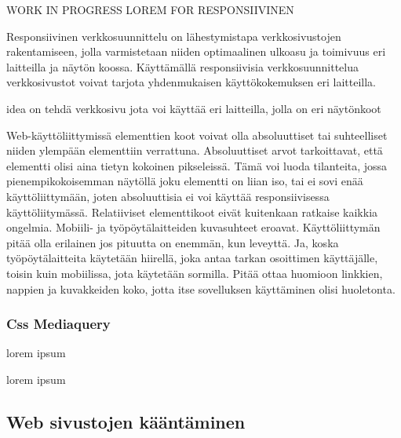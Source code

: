 \documentclass[11pt,a4paper,titlepage,oneside]{article}
\begin{document}
WORK IN PROGRESS LOREM FOR RESPONSIIVINEN
\medskip


Responsiivinen verkkosuunnittelu on lähestymistapa verkkosivustojen rakentamiseen, jolla varmistetaan niiden optimaalinen ulkoasu ja toimivuus eri laitteilla ja näytön koossa.
Käyttämällä responsiivisia verkkosuunnittelua verkkosivustot voivat tarjota yhdenmukaisen käyttökokemuksen eri laitteilla.

idea on tehdä verkkosivu jota voi käyttää eri laitteilla, jolla on eri näytönkoot
\medskip


Web-käyttöliittymissä elementtien koot voivat olla absoluuttiset tai suhteelliset niiden ylempään elementtiin verrattuna. Absoluuttiset arvot tarkoittavat, että elementti olisi aina tietyn kokoinen pikseleissä. 
Tämä voi luoda tilanteita, jossa pienempikokoisemman näytöllä joku elementti on liian iso, tai ei sovi enää käyttöliittymään, joten absoluuttisia ei voi käyttää responsiivisessa käyttöliitymässä.
Relatiiviset elementtikoot eivät kuitenkaan ratkaise kaikkia ongelmia. Mobiili- ja työpöytälaitteiden kuvasuhteet eroavat. Käyttöliittymän pitää olla erilainen jos pituutta on enemmän, kun leveyttä. 
Ja, koska työpöytälaitteita käytetään hiirellä, joka antaa tarkan osoittimen käyttäjälle, toisin kuin mobiilissa, jota käytetään sormilla. 
Pitää ottaa huomioon linkkien, nappien ja kuvakkeiden koko, jotta itse sovelluksen käyttäminen olisi huoletonta.\medskip
\medskip




\subsubsection{Css Mediaquery}

lorem ipsum

lorem ipsum






\newpage
\subsection{Web sivustojen kääntäminen}



\end{document}
